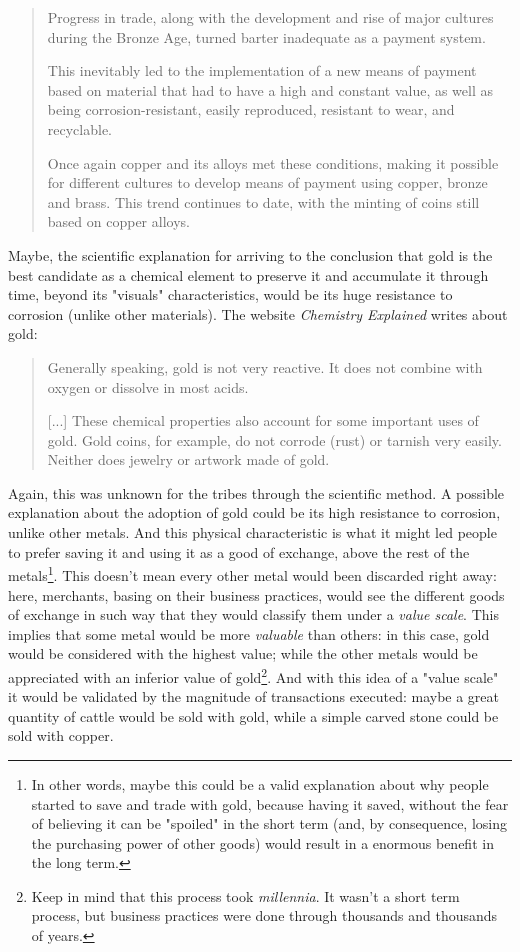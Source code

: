 \documentclass[12pt,a4paper,twoside]{book}
\begin{document}
\begin{quotation}
Progress in trade, along with the development and rise of major cultures during the Bronze Age, turned barter inadequate as a payment system.

This inevitably led to the implementation of a new means of payment based on material that had to have a high and constant value, as well as being corrosion-resistant, easily reproduced, resistant to wear, and recyclable.

Once again copper and its alloys met these conditions, making it possible for different cultures to develop means of payment using copper, bronze and brass. This trend continues to date, with the minting of coins still based on copper alloys. \cite[p. 37]{codelco:copper}
\end{quotation}

Maybe, the scientific explanation for arriving to the conclusion that gold is the best candidate as a chemical element to preserve it and accumulate it through time, beyond its "visuals" characteristics, would be its huge resistance to corrosion (unlike other materials). The website \textit{Chemistry Explained} writes about gold:

\begin{quotation}
Generally speaking, gold is not very reactive. It does not combine with oxygen or dissolve in most acids.

[...] These chemical properties also account for some important uses of gold. Gold coins, for example, do not corrode (rust) or tarnish very easily. Neither does jewelry or artwork made of gold. \cite{chemistry:gold}
\end{quotation}

Again, this was unknown for the tribes through the scientific method. A possible explanation about the adoption of gold could be its high resistance to corrosion, unlike other metals. And this physical characteristic is what it might led people to prefer saving it and using it as a good of exchange, above the rest of the metals\footnote{In other words, maybe this could be a valid explanation about why people started to save and trade with gold, because having it saved, without the fear of believing it can be "spoiled" in the short term (and, by consequence, losing the purchasing power of other goods) would result in a enormous benefit in the long term.}. This doesn't mean every other metal would been discarded right away: here, merchants, basing on their business practices, would see the different goods of exchange in such way that they would classify them under a \textit{value scale}. This implies that some metal would be more \textit{valuable} than others: in this case, gold would be considered with the highest value; while the other metals would be appreciated with an inferior value of gold\footnote{Keep in mind that this process took \textit{millennia}. It wasn't a short term process, but business practices were done through thousands and thousands of years.}. And with this idea of a "value scale" it would be validated by the magnitude of transactions executed: maybe a great quantity of cattle would be sold with gold, while a simple carved stone could be sold with copper.
\end{document}

